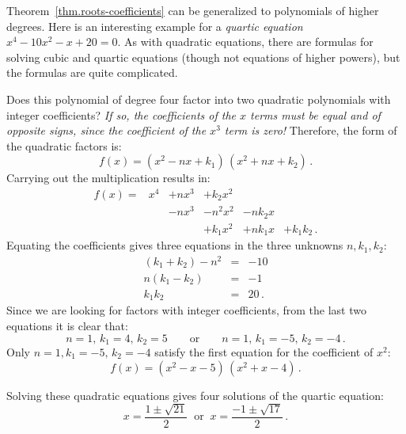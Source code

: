 \begin{example}
Theorem~\ref{thm.roots-coefficients} can be generalized to polynomials of higher degrees. Here is an interesting example for a \emph{quartic equation} $x^4-10x^2-x+20=0$. As with quadratic equations, there are formulas for solving cubic and quartic equations (though not equations of higher powers), but the formulas are quite complicated.

Does this polynomial of degree four factor into two quadratic polynomials with integer coefficients? \textit{If so, the coefficients of the $x$ terms must be equal and of opposite signs, since the coefficient of the $x^3$ term is zero!} Therefore, the form of the quadratic factors is:
\[
f(x) = (x^2 - nx + k_1)\, (x^2 + nx + k_2)\,.
\]
Carrying out the multiplication results in:
\[
\renewcommand{\arraystretch}{1.1}
\begin{array}{rrrrrr}
f(x) = &x^4 & + nx^3 & + k_2 x^2\\
&& -nx^3 &- n^2x^2 &-nk_2x\\
&&&+k_1x^2 &+ nk_1x &+ k_1k_2\,.
\end{array}
\]
Equating the coefficients gives three equations in the three unknowns $n,k_1,k_2$:
\begin{eqnarray*}
(k_1+k_2)-n^2 &=& -10\\
n(k_1-k_2) &=& -1\\
k_1k_2 &=& 20\,.
\end{eqnarray*}
Since we are looking for factors with integer coefficients, from the last two equations it is clear that:
\[
n=1,\,k_1=4,\,k_2=5  \quad\quad\textrm{or} \quad\quad n=1,\,k_1=-5,\, k_2=-4\,.
\]
Only $n=1,k_1=-5,\, k_2=-4$ satisfy the first equation for the coefficient of $x^2$:
\[
f(x) = (x^2 - x - 5)\, (x^2 + x - 4)\,.
\]

\newpage

Solving these quadratic equations gives four solutions of the quartic equation:
\[
x = \frac{1\pm\sqrt{21}}{2}  \;\;\textrm{or} \;\; x= \frac{-1\pm\sqrt{17}}{2} \,.
\]
\end{example}


